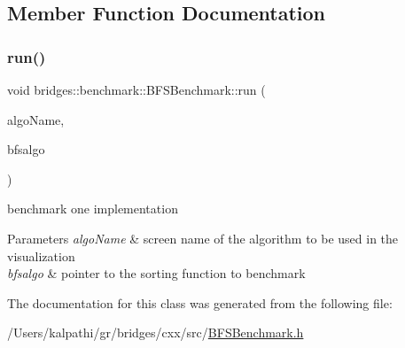 \subsection{Member Function Documentation}
\mbox{\label{classbridges_1_1benchmark_1_1_b_f_s_benchmark_a8ac66a16c89ecc01b43dc88f9246885c}} 
\subsubsection{\texorpdfstring{run()}{run()}}
{\footnotesize\ttfamily void bridges\+::benchmark\+::\+B\+F\+S\+Benchmark\+::run (\begin{DoxyParamCaption}\item[{std\+::string}]{algo\+Name,  }\item[{void($\ast$)(const \mbox{\hyperlink{classbridges_1_1datastructure_1_1_graph_adj_list}{Graph\+Adj\+List}}$<$ std\+::string $>$ \&gr, std\+::string root, std\+::unordered\+\_\+map$<$ std\+::string, int $>$ \&level, std\+::unordered\+\_\+map$<$ std\+::string, std\+::string $>$ \&parent)}]{bfsalgo }\end{DoxyParamCaption})\hspace{0.3cm}{\ttfamily [inline]}}



benchmark one implementation 


\begin{DoxyParams}{Parameters}
{\em algo\+Name} & screen name of the algorithm to be used in the visualization \\
\hline
{\em bfsalgo} & pointer to the sorting function to benchmark \\
\hline
\end{DoxyParams}


The documentation for this class was generated from the following file\+:\begin{DoxyCompactItemize}
\item 
/\+Users/kalpathi/gr/bridges/cxx/src/\mbox{\hyperlink{_b_f_s_benchmark_8h}{B\+F\+S\+Benchmark.\+h}}\end{DoxyCompactItemize}
